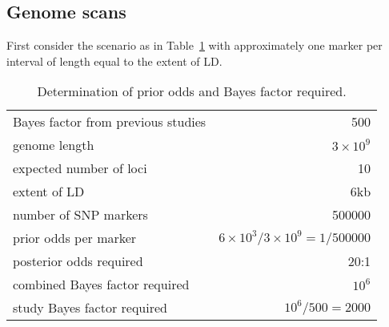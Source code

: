 \documentclass[a4paper,10pt]{amsart}
\begin{document}
\subsection{Genome scans}
\label{sec:genomescans}
First consider the scenario as in Table~\ref{tbl:scenario1} with approximately
one marker per interval of length equal to the extent of LD.

\begin{table}[htbp]
\caption{Determination of prior odds and Bayes factor required.}
\label{tbl:scenario1}
\begin{tabular}{|l|r|}
\hline\hline
Bayes factor from previous studies & 500 \\
genome length           &  $3\times 10^9$ \\
expected number of loci & 10 \\
extent of LD            & 6kb \\
number of SNP markers   & 500000 \\
prior odds per marker   & $6\times 10^3/3\times 10^9 = 1/500000 $ \\
posterior odds required &  20:1\\
combined Bayes factor required   &  $10^6$\\
study Bayes factor required & $10^6/500 = 2000$\\
\hline
\end{tabular}
\end{table}

\end{document}
